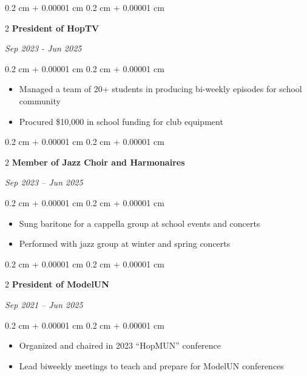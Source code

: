 \documentclass[10pt, letterpaper]{article}
\newenvironment{highlights}{
    \begin{itemize}[
        topsep=0.10 cm,
        parsep=0.10 cm,
        partopsep=0pt,
        itemsep=0pt,
        leftmargin=0.4 cm + 10pt
    ]
}{
    \end{itemize}
} %
\newenvironment{onecolentry}{
    \begin{adjustwidth}{
        0.2 cm + 0.00001 cm
    }{
        0.2 cm + 0.00001 cm
    }
}{
    \end{adjustwidth}
} %
\newenvironment{twocolentry}[2][]{
    \onecolentry
    \def\secondColumn{#2}
    \setcolumnwidth{\fill, 4.5 cm}
    \begin{paracol}{2}
}{
    \switchcolumn \raggedleft \secondColumn
    \end{paracol}
    \endonecolentry
} %
\begin{document}
             \begin{twocolentry}{\textit{Sep 2023 - Jun 2025 }}{\textbf{President of HopTV}}
    \end{twocolentry}
    
    \vspace{0.10 cm}
    
    \begin{onecolentry}
        \begin{highlights}
            \item Managed a team of 20+ students in producing bi-weekly episodes for school community
            \item Procured \$10,000 in school funding for club equipment
        \end{highlights}
    \end{onecolentry}
    
    \vspace{0.2 cm}
    
    \begin{twocolentry}{\textit{Sep 2023 – Jun 2025 }}{\textbf{Member of Jazz Choir and Harmonaires}}
    \end{twocolentry}
    
    \vspace{0.10 cm}
    
    \begin{onecolentry}
        \begin{highlights}
            \item Sung baritone for a cappella group at school events and concerts  
            \item Performed with jazz group at winter and spring concerts
        \end{highlights}
    \end{onecolentry}
    
    \vspace{0.2 cm}
    
    \begin{twocolentry}{\textit{Sep 2021 – Jun 2025 }}{\textbf{President of ModelUN}}
    \end{twocolentry}
    
    \vspace{0.10 cm}
    
    \begin{onecolentry}
        \begin{highlights}
            \item Organized and chaired in 2023 “HopMUN” conference
            \item Lead biweekly meetings to teach and prepare for ModelUN conferences
        \end{highlights}
    \end{onecolentry}
    
\end{document}
